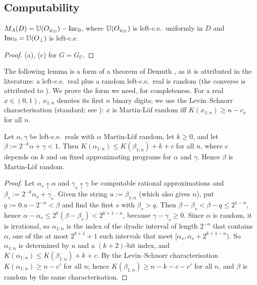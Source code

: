 \subsection{Computability}\label{app:basic:computability}

\begin{proposition}\label{prop:basic:form}
$M_{A}(D)=\mathbb{U}(O_{\psi_D})-\mathrm{Inc}_0$, where $\mathbb{U}(O_{\psi_D})$ is left-c.e.\ uniformly in $D$ and $\mathrm{Inc}_0=\mathbb{U}(O_\bot)$ is left-c.e.
\end{proposition}

\begin{proof}
(a), (c) for $G=G_U$.
\end{proof}

The following lemma is a form of a theorem of Demuth \citep{demuth1975constructive}, as it is attributed in the literature: a left-c.e.\ real plus a random left-c.e.\ real is random (the converse is attributed to \citealp{downey2002randomness}). We prove the form we need, for completeness. For a real $x\in(0,1)$, $x_{1:n}$ denotes its first $n$ binary digits; we use the Levin--Schnorr characterisation (standard; see \citealp{li2008introduction}): $x$ is Martin-L\"of random iff $K(x_{1:n})\ge n-c_x$ for all $n$.

\begin{lemma}\label{lem:basic:demuth}
Let $\alpha,\gamma$ be left-c.e.\ reals with $\alpha$ Martin-L\"of random, let $k\ge0$, and let $\beta:=2^{-k}\alpha+\gamma<1$. Then $K(\alpha_{1:n})\le K(\beta_{1:n})+k+c$ for all $n$, where $c$ depends on $k$ and on fixed approximating programs for $\alpha$ and $\gamma$. Hence $\beta$ is Martin-L\"of random.
\end{lemma}

\begin{proof}
Let $\alpha_s\uparrow\alpha$ and $\gamma_s\uparrow\gamma$ be computable rational approximations and $\beta_s:=2^{-k}\alpha_s+\gamma_s$. Given the string $u:=\beta_{1:n}$ (which also gives $n$), put $q:=0.u-2^{-n}<\beta$ and find the first $s$ with $\beta_s>q$. Then $\beta-\beta_s<\beta-q\le2^{1-n}$, hence $\alpha-\alpha_s\le2^k(\beta-\beta_s)<2^{k+1-n}$, because $\gamma-\gamma_s\ge0$. Since $\alpha$ is random, it is irrational, so $\alpha_{1:n}$ is the index of the dyadic interval of length $2^{-n}$ that contains $\alpha$, one of the at most $2^{k+1}+1$ such intervals that meet $[\alpha_s,\alpha_s+2^{k+1-n})$. So $\alpha_{1:n}$ is determined by $u$ and a $(k+2)$-bit index, and $K(\alpha_{1:n})\le K(\beta_{1:n})+k+c$. By the Levin--Schnorr characterisation $K(\alpha_{1:n})\ge n-c'$ for all $n$; hence $K(\beta_{1:n})\ge n-k-c-c'$ for all $n$, and $\beta$ is random by the same characterisation.
\end{proof}

